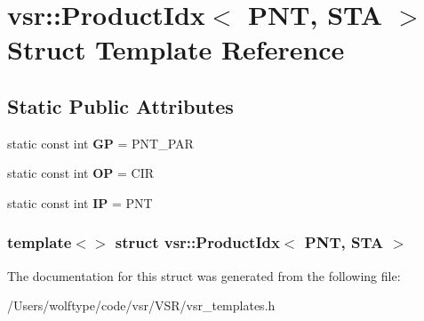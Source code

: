 \hypertarget{structvsr_1_1_product_idx_3_01_p_n_t_00_01_s_t_a_01_4}{\section{vsr\-:\-:Product\-Idx$<$ P\-N\-T, S\-T\-A $>$ Struct Template Reference}
\label{structvsr_1_1_product_idx_3_01_p_n_t_00_01_s_t_a_01_4}
}
\subsection*{Static Public Attributes}
\begin{DoxyCompactItemize}
\item 
\hypertarget{structvsr_1_1_product_idx_3_01_p_n_t_00_01_s_t_a_01_4_a59c7bd6a624b0b4ed1bc585b17eefee9}{static const int {\bfseries G\-P} = P\-N\-T\-\_\-\-P\-A\-R}\label{structvsr_1_1_product_idx_3_01_p_n_t_00_01_s_t_a_01_4_a59c7bd6a624b0b4ed1bc585b17eefee9}

\item 
\hypertarget{structvsr_1_1_product_idx_3_01_p_n_t_00_01_s_t_a_01_4_a579c3f53cef7ab2b147177948768927d}{static const int {\bfseries O\-P} = C\-I\-R}\label{structvsr_1_1_product_idx_3_01_p_n_t_00_01_s_t_a_01_4_a579c3f53cef7ab2b147177948768927d}

\item 
\hypertarget{structvsr_1_1_product_idx_3_01_p_n_t_00_01_s_t_a_01_4_a8e986f32fcdcbb17c579f79bd5564445}{static const int {\bfseries I\-P} = P\-N\-T}\label{structvsr_1_1_product_idx_3_01_p_n_t_00_01_s_t_a_01_4_a8e986f32fcdcbb17c579f79bd5564445}

\end{DoxyCompactItemize}
\subsubsection*{template$<$$>$ struct vsr\-::\-Product\-Idx$<$ P\-N\-T, S\-T\-A $>$}



The documentation for this struct was generated from the following file\-:\begin{DoxyCompactItemize}
\item 
/\-Users/wolftype/code/vsr/\-V\-S\-R/vsr\-\_\-templates.\-h\end{DoxyCompactItemize}
